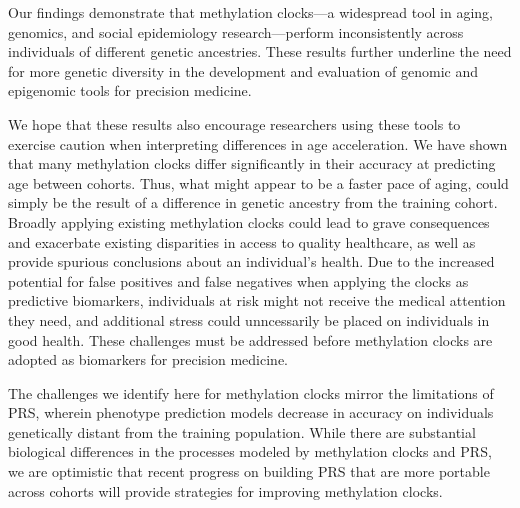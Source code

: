 
Our findings demonstrate that methylation clocks---a widespread tool in aging, genomics, and social epidemiology research---perform inconsistently across individuals of different genetic ancestries. These results further underline the need for more genetic diversity in the development and evaluation of genomic and epigenomic tools for precision medicine.

We hope that these results also encourage researchers using these tools to exercise caution when interpreting differences in age acceleration. We have shown that many methylation clocks differ significantly in their accuracy at predicting age between cohorts. Thus, what might appear to be a faster pace of aging, could simply be the result of a difference in genetic ancestry from the training cohort. Broadly applying existing methylation clocks could lead to grave consequences and exacerbate existing disparities in access to quality healthcare, as well as provide spurious conclusions about an individual's health. Due to the increased potential for false positives and false negatives when applying the clocks as predictive biomarkers, individuals at risk might not receive the medical attention they need, and additional stress could unncessarily be placed on individuals in good health. These challenges must be addressed before methylation clocks are adopted as biomarkers for precision medicine. 

The challenges we identify here for methylation clocks mirror the limitations of PRS, wherein phenotype prediction models decrease in accuracy on individuals genetically distant from the training population. While there are substantial biological differences in the processes modeled by methylation clocks and PRS, we are optimistic that recent progress on building PRS that are more portable across cohorts will provide strategies for improving methylation clocks. 

